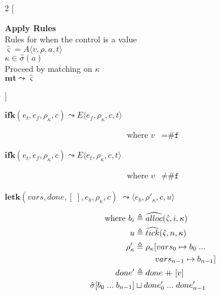 \documentclass[12pt,draft]{article}
\newcommand\mdoubleplus{\ensuremath{\mathbin{+\mkern-9mu+}}}
\newcommand{\falsesyn}{\texttt{\#f}}
\begin{document}
\begin{multicols*}{2}
[
\begin{center}
\textbf{Apply Rules} \\
Rules for when the control is a value \\
$\hat{\varsigma} = A\langle v , \rho , a , t \rangle$ \\
$\kappa \in \hat{\sigma}(a)$ \\
Proceed by matching on $\kappa$ \\
\vspace{5mm}
$\textbf{mt} \leadsto \hat{\varsigma}$
\end{center}
\vspace{-5mm}
]
\begin{center}
  $\textbf{ifk}(e_t, e_f, \rho_\kappa, c)
  \leadsto E\langle e_f , \rho_\kappa , c , t \rangle$
\end{center}
\vspace{-7mm}
\begin{align*}
\text{where } v &= \falsesyn
\end{align*}
\begin{center}
  $\textbf{ifk}(e_t, e_f, \rho_\kappa, c)
  \leadsto E\langle e_t , \rho_\kappa , c , t \rangle$
\end{center}
\vspace{-7mm}
\begin{align*}
\text{where } v &\not= \falsesyn
\end{align*}
\begin{center}
  $\textbf{letk}(vars, done, [\;], e_b, \rho_\kappa , c)$
  $\leadsto \langle e_b , \rho'_\kappa , c , u \rangle $
\end{center}
\vspace{-7mm}
\begin{align*}
\text{where } b_i &\triangleq \widehat{alloc}(\hat{\varsigma}, i, \kappa) \\
u &\triangleq \widehat{tick}(\hat{\varsigma}, n, \kappa) \\
\rho'_{\kappa} &\triangleq \rho_{\kappa}[vars_0 \mapsto b_0\;...\\
&\;\;\;\;\;\;\;\;\;  vars_{n-1} \mapsto b_{n-1}] \\
  done' &\triangleq done \mdoubleplus [v] \\
\hat{\sigma}[b_0\;...\;b_{n-1}] &\sqcup done'_0\;...\;done'_{n-1}

\end{align*}
\end{multicols*}
\end{document}
